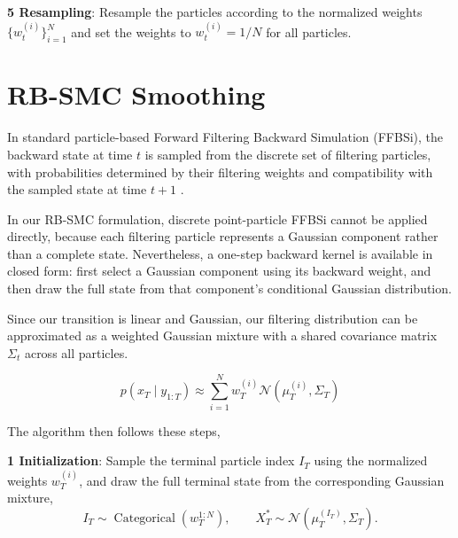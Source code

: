 \textbf{5 Resampling}: Resample the particles according to the normalized weights $\{w_t^{(i)}\}_{i=1}^N$ and set the weights to $w_t^{(i)} = 1/N$ for all particles.

\section{RB-SMC Smoothing}
\label{sec:rb-smc-smoothing}

In standard particle-based Forward Filtering Backward Simulation (FFBSi), the backward state at time $t$ is sampled from the discrete set of filtering particles, with probabilities determined by their filtering weights and compatibility with the sampled state at time $t+1$ \citep{godsilldoucetwest2004montecarlosmoothing}. 


In our RB-SMC formulation, discrete point-particle FFBSi cannot be applied directly, because each filtering particle represents a Gaussian component rather than a complete state. Nevertheless, a one-step backward kernel is available in closed form: first select a Gaussian component using its backward weight, and then draw the full state from that component's conditional Gaussian distribution.

Since our transition is linear and Gaussian, our filtering distribution can be approximated as a weighted Gaussian mixture with a shared covariance matrix $\Sigma_t$ across all particles. 

\begin{equation}
    p(x_{T} \mid y_{1:T}) \approx \sum_{i=1}^N w_{T}^{(i)} \mathcal{N}(\mu_T^{(i)}, \Sigma_T)
\end{equation}

The algorithm then follows these steps,

\textbf{1 Initialization}: Sample the terminal particle index $I_T$ using the normalized weights $w_T^{(i)}$, and draw the full terminal state from the corresponding Gaussian mixture,
\begin{equation}
    I_T \sim \operatorname{Categorical}(w_T^{1:N}), \qquad X_T^* \sim \mathcal{N}(\mu_T^{(I_T)}, \Sigma_T). \nonumber
\end{equation}

